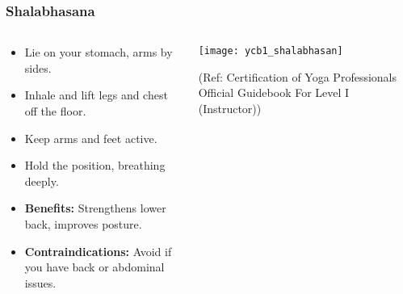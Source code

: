 \begin{frame}[fragile]\frametitle{Shalabhasana}
\begin{columns}
    \begin{column}[T]{0.5\linewidth}
      \begin{itemize}
        \item Lie on your stomach, arms by sides.
        \item Inhale and lift legs and chest off the floor.
        \item Keep arms and feet active.
        \item Hold the position, breathing deeply.
        \item \textbf{Benefits:} Strengthens lower back, improves posture.
        \item \textbf{Contraindications:} Avoid if you have back or abdominal issues.
      \end{itemize}
    \end{column}
    \begin{column}[T]{0.5\linewidth}
        \begin{center}
        \begin{center}
		        \texttt{[image: ycb1\_shalabhasan]}
				
				{\tiny (Ref: Certification  of Yoga Professionals Official Guidebook For Level I (Instructor))}	        
		\end{center}   
        \end{center}    
    \end{column}
  \end{columns}
\end{frame}

